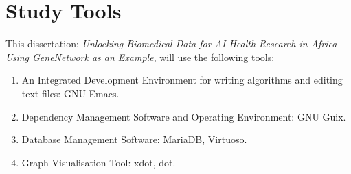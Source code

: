 \documentclass[11pt]{article}
\author{Munyoki Kilyungi}
\date{\today}
\title{}
\begin{document}
\section{Study Tools}

This dissertation: \textit{Unlocking Biomedical Data for AI Health Research in Africa Using GeneNetwork as an Example}, will use the following tools:

\begin{enumerate}
\item An Integrated Development Environment for writing algorithms and editing text files: GNU Emacs.
\item Dependency Management Software and Operating Environment: GNU Guix.
\item Database Management Software: MariaDB, Virtuoso.
\item Graph Visualisation Tool: xdot, dot.
\end{enumerate}
\end{document}
